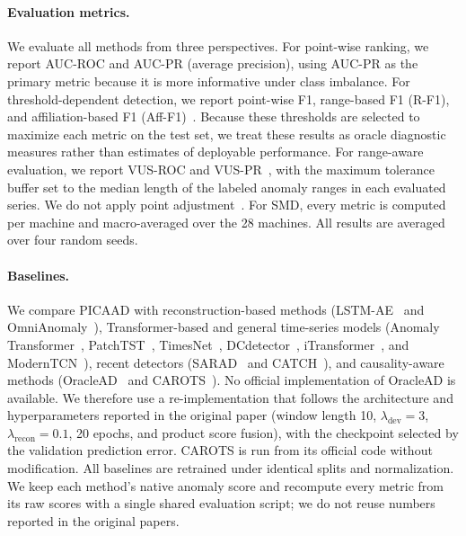 \documentclass[letterpaper]{article}
\begin{document}
\paragraph{Evaluation metrics.}
We evaluate all methods from three perspectives. For point-wise ranking, we report AUC-ROC and AUC-PR (average precision), using AUC-PR as the primary metric because it is more informative under class imbalance. For threshold-dependent detection, we report point-wise F1, range-based F1 (R-F1), and affiliation-based F1 (Aff-F1)~\cite{huet2022affiliation}. Because these thresholds are selected to maximize each metric on the test set, we treat these results as oracle diagnostic measures rather than estimates of deployable performance. For range-aware evaluation, we report VUS-ROC and VUS-PR~\cite{paparrizos2022vus}, with the maximum tolerance buffer set to the median length of the labeled anomaly ranges in each evaluated series. We do not apply point adjustment~\cite{kim2022rigorous}. For SMD, every metric is computed per machine and macro-averaged over the 28 machines. All results are averaged over four random seeds.

\paragraph{Baselines.}
We compare PICAAD with reconstruction-based methods (LSTM-AE~\cite{malhotra2016lstm} and OmniAnomaly~\cite{su2019omni}), Transformer-based and general time-series models (Anomaly Transformer~\cite{xu2022anomaly}, PatchTST~\cite{nie2023patchtst}, TimesNet~\cite{wu2023timesnet}, DCdetector~\cite{yang2023dcdetector}, iTransformer~\cite{liu2024itransformer}, and ModernTCN~\cite{luo2024moderntcn}), recent detectors (SARAD~\cite{dai2024sarad} and CATCH~\cite{wu2025catch}), and causality-aware methods (OracleAD~\cite{cho2025oraclead} and CAROTS~\cite{kim2025carots}). No official implementation of OracleAD is available. We therefore use a re-implementation that follows the architecture and hyperparameters reported in the original paper (window length 10, $\lambda_{\mathrm{dev}}=3$, $\lambda_{\mathrm{recon}}=0.1$, 20 epochs, and product score fusion), with the checkpoint selected by the validation prediction error. CAROTS is run from its official code without modification. All baselines are retrained under identical splits and normalization. We keep each method's native anomaly score and recompute every metric from its raw scores with a single shared evaluation script; we do not reuse numbers reported in the original papers.
\end{document}

